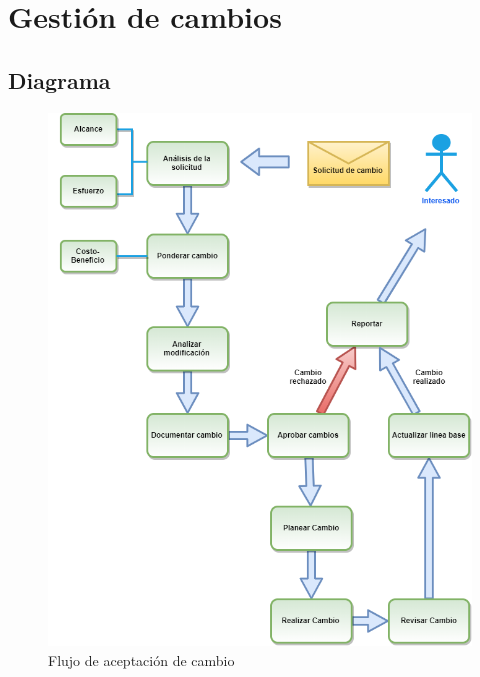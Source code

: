 \section{Gestión de cambios}
\subsection{Diagrama}
\begin{figure}[H]
    \centering
    \includegraphics[scale=0.50]{Files/gestCambios.png}
    \caption{Flujo de aceptación de cambio}
    \label{fig:clases}
\end{figure}

